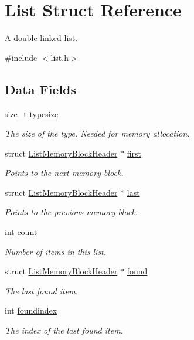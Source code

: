 \hypertarget{struct_list}{\section{List Struct Reference}
\label{struct_list}
}


A double linked list.  




{\ttfamily \#include $<$list.\-h$>$}

\subsection*{Data Fields}
\begin{DoxyCompactItemize}
\item 
size\-\_\-t \hyperlink{struct_list_aae15b6d77b58dbd6f21861d1320ec961}{typesize}
\begin{DoxyCompactList}\small\item\em The size of the type. Needed for memory allocation. \end{DoxyCompactList}\item 
struct \hyperlink{struct_list_memory_block_header}{List\-Memory\-Block\-Header} $\ast$ \hyperlink{struct_list_aad341c9d11e18ba0ff4abe71e916bf4c}{first}
\begin{DoxyCompactList}\small\item\em Points to the next memory block. \end{DoxyCompactList}\item 
struct \hyperlink{struct_list_memory_block_header}{List\-Memory\-Block\-Header} $\ast$ \hyperlink{struct_list_a512a4382e503046b144aef2735fe7f9d}{last}
\begin{DoxyCompactList}\small\item\em Points to the previous memory block. \end{DoxyCompactList}\item 
int \hyperlink{struct_list_ad43c3812e6d13e0518d9f8b8f463ffcf}{count}
\begin{DoxyCompactList}\small\item\em Number of items in this list. \end{DoxyCompactList}\item 
struct \hyperlink{struct_list_memory_block_header}{List\-Memory\-Block\-Header} $\ast$ \hyperlink{struct_list_ad2024b5b87cb5f5fb344d1838c49b77f}{found}
\begin{DoxyCompactList}\small\item\em The last found item. \end{DoxyCompactList}\item 
int \hyperlink{struct_list_a6f582e298e6ce683da843212054a65bc}{foundindex}
\begin{DoxyCompactList}\small\item\em The index of the last found item. \end{DoxyCompactList}\end{DoxyCompactItemize}


